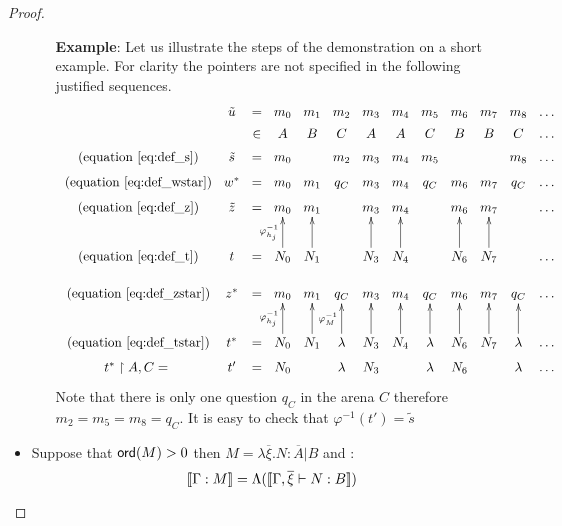 \begin{proof}
\begin{itemize}
\begin{itemize}
        \textbf{Example}: Let us illustrate the steps of the demonstration on a short example.
         For clarity the pointers are not specified in the following justified sequences.
        $$
        \xymatrix @=3pt{
          & \tilde{u} &=& m_0 & m_1 & m_2 & m_3 & m_4 & m_5 & m_6 & m_7 & m_8 & \ldots \\
          & &\in& A & B & C & A & A & C & B & B & C & \ldots \\
          \mbox{ (equation \ref{eq:def_s})} & \tilde{s} &=& m_0 & & m_2 & m_3 & m_4 & m_5 &  & & m_8 & \ldots \\
          \mbox{ (equation \ref{eq:def_wstar})} & w^\ast &=& m_0 & m_1 & q_C & m_3 & m_4 & q_C & m_6 & m_7 & q_C & \ldots \\
          \mbox{ (equation \ref{eq:def_z})} & \tilde{z}  &=& m_0 & m_1 &  & m_3 & m_4 &  & m_6 & m_7 &  & \ldots  \\ \\ \\
          \mbox{ (equation \ref{eq:def_t})} & t &=& N_0 \ar[uuu]^{\varphi^{-1}_{h_j}} & N_1\ar[uuu] &  & N_3 \ar[uuu] & N_4\ar[uuu] & & N_6\ar[uuu] & N_7\ar[uuu] &  & \ldots \\ \\
          \mbox{ (equation \ref{eq:def_zstar})} & z^\ast  &=& m_0 & m_1 & q_C & m_3 & m_4 & q_C & m_6 & m_7 & q_C & \ldots  \\ \\ \\
          \mbox{ (equation \ref{eq:def_tstar})} & t^\ast &=& N_0 \ar[uuu]^{\varphi^{-1}_{h_j}} & N_1\ar[uuu] & \lambda\ar[uuu]^{\varphi^{-1}_{M}} & N_3 \ar[uuu] & N_4\ar[uuu] & \lambda\ar[uuu] & N_6\ar[uuu] & N_7\ar[uuu] & \lambda\ar[uuu] & \ldots \\
          t^\ast\upharpoonright A,C =& t' &=& N_0 &  & \lambda & N_3 &  & \lambda & N_6 &  & \lambda & \ldots \\
          }
        $$
        Note that there is only one question $q_C$ in the arena $C$ therefore $m_2 = m_5 = m_8 = q_C$.
        It is easy to check that $\varphi^{-1}(t') = \tilde{s}$


        \end{itemize}

    \item Suppose that ${\sf ord}(M) > 0$ then $M = \lambda \overline{\xi} . N : \overline{A}|B$ and :
    $$ {[\![ \Gamma : M ]\!]} = \Lambda( {[\![ \Gamma,\overline{\xi} \vdash N: B ]\!]} )$$
\end{itemize}

\end{proof}

